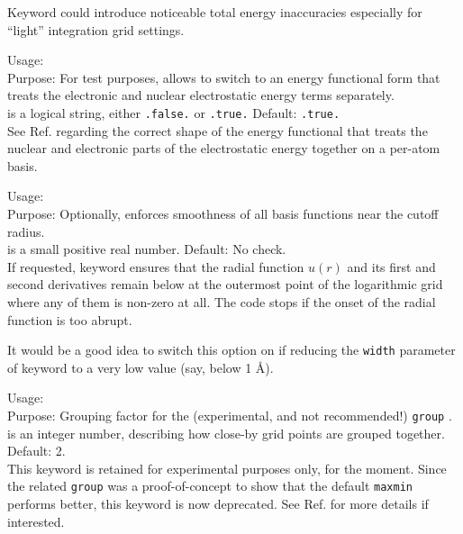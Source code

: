 Keyword  could introduce noticeable total energy 
inaccuracies especially for ``light'' integration grid settings.


{
  \noindent
  Usage:   \\[1.0ex]
  Purpose: For test purposes, allows to switch to an energy functional
    form that treats the electronic and nuclear electrostatic energy
    terms separately. \\[1.0ex]
   is a logical string, either \texttt{.false.} or
    \texttt{.true.} Default: \texttt{.true.} \\
}
See Ref. \cite{Blum08} regarding the correct shape of the energy
functional that treats the nuclear and electronic parts of the
electrostatic energy together on a per-atom basis.

{
  \noindent
  Usage:   \\[1.0ex]
  Purpose: Optionally, enforces smoothness of all basis functions near
    the cutoff radius. \\[1.0ex]
   is a small positive real number. Default: No
    check. \\
}
If requested, keyword  ensures that the
radial function $u(r)$ and its first and second derivatives remain
below  at the outermost point of the logarithmic
grid where any of them is non-zero at all. The code stops if the onset
of the radial function is too abrupt. 

It would be a good idea to switch this option on if reducing the 
\texttt{width} parameter of keyword  to a very low
value (say, below 1 {\AA}).

{
  \noindent
  Usage:   \\[1.0ex]
  Purpose: Grouping factor for the (experimental, and not recommended!) 
    \texttt{group} . \\[1.0ex]
   is an integer number, describing how close-by grid
    points are grouped together. Default: 2. \\
}
This keyword is retained for experimental purposes only, for the
moment. Since the related 
\texttt{group} was a proof-of-concept to show that the default
\texttt{maxmin} performs better, this keyword is now deprecated. See
Ref. \cite{Havu08} for more details if interested.

